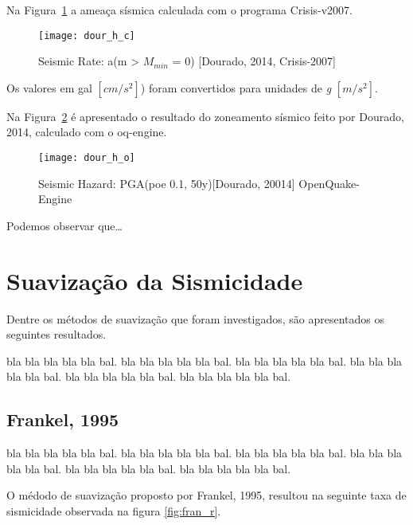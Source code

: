 Na Figura~\ref{fig:dour_h_c} a ameaça sísmica calculada com o programa
Crisis-v2007.

\begin{figure}[!h]
  \centering
  \texttt{[image: dour\_h\_c]} 
  \caption{Seismic Rate: a(m > $M_{min}$ = 0) [Dourado, 2014, Crisis-2007] }
  \label{fig:dour_h_c} 
\end{figure}

Os valores em gal $[cm/s^2]$) foram convertidos para unidades de \emph{g}
$[m/s^2]$.


Na Figura~\ref{fig:dour_h_o} é apresentado o resultado do zoneamento sísmico
feito por Dourado, 2014, calculado com o oq-engine.

\begin{figure}[!h]
  \centering
  \texttt{[image: dour\_h\_o]} 
  \caption{Seismic Hazard: PGA(poe 0.1, 50y)[Dourado, 20014] OpenQuake-Engine }
  \label{fig:dour_h_o} 
\end{figure}


Podemos observar que\ldots


\section{Suavização da Sismicidade}
\label{sec:fundamentos}

Dentre os métodos de suavização que foram investigados, são apresentados os
seguintes resultados.

bla bla bla bla bla bal.
bla bla bla bla bla bal.
bla bla bla bla bla bal.
bla bla bla bla bla bal.
bla bla bla bla bla bal.
bla bla bla bla bla bal.



\subsection{Frankel, 1995}
\label{sec:fundamentos}

bla bla bla bla bla bal.
bla bla bla bla bla bal.
bla bla bla bla bla bal.
bla bla bla bla bla bal.
bla bla bla bla bla bal.
bla bla bla bla bla bal.



O médodo de suavização proposto por Frankel, 1995, resultou na seguinte taxa de
sismicidade observada na figura \ref{fig:fran_r}.

